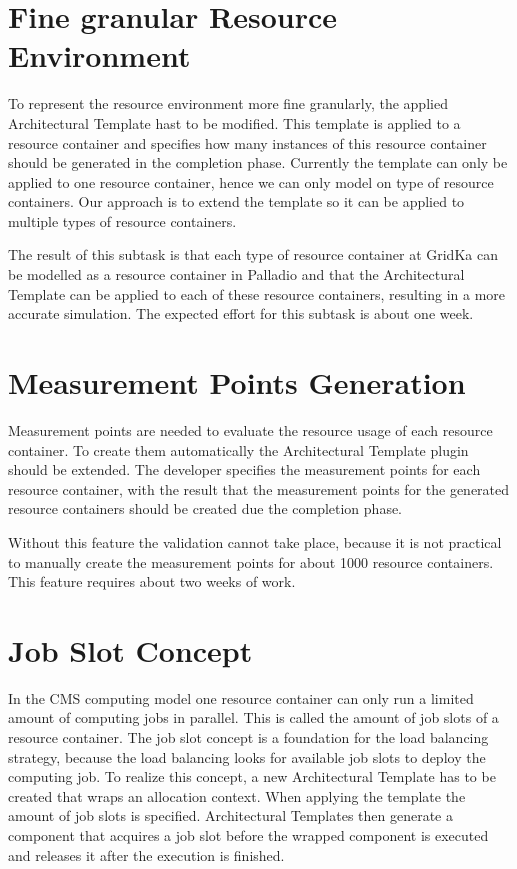 \section{Fine granular Resource Environment}
To represent the resource environment more fine granularly, the applied Architectural Template hast to be modified.
This template is applied to a resource container and specifies how many instances of this resource container should be generated in the completion phase.
Currently the template can only be applied to one resource container, hence we can only model on type of resource containers. Our approach is to extend the template so it can be applied to multiple types of resource containers.

The result of this subtask is that each type of resource container at GridKa can be modelled as a resource container in Palladio and that the Architectural Template can be applied to each of these resource containers, resulting in a more accurate simulation.
The expected effort for this subtask is about one week.

\section{Measurement Points Generation}
Measurement points are needed to evaluate the resource usage of each resource container. To create them automatically the Architectural Template plugin should be extended. The developer specifies the measurement points for each resource container, with the result that the measurement points for the generated resource containers should be created due the completion phase.

Without this feature the validation cannot take place, because it is not practical to manually create the measurement points for about 1000 resource containers. This feature requires about two weeks of work.

\section{Job Slot Concept}
In the CMS computing model one resource container can only run a limited amount of computing jobs in parallel. This is called the amount of job slots of a resource container. The job slot concept is a foundation for the load balancing strategy, because the load balancing looks for available job slots to deploy the computing job. To realize this concept, a new Architectural Template has to be created that wraps an allocation context. When applying the template the amount of job slots is specified. Architectural Templates then generate a component that acquires a job slot before the wrapped component is executed and releases it after the execution is finished.

